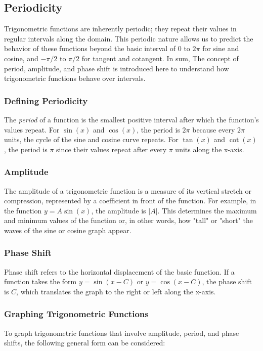 \documentclass[a4paper,12pt]{book}
\newcounter{example}
\begin{document}
\subsection{Periodicity}
\label{subsec:periodicity}

Trigonometric functions are inherently periodic; they repeat their values in regular intervals along the domain. This periodic nature allows us to predict the behavior of these functions beyond the basic interval of \(0\) to \(2\pi\) for sine and cosine, and \( -\pi/2 \) to \( \pi/2 \) for tangent and cotangent.
In sum, The concept of period, amplitude, and phase shift is introduced here to understand how trigonometric functions behave over intervals.

\subsubsection*{Defining Periodicity}
The \textit{period} of a function is the smallest positive interval after which the function's values repeat. For \( \sin(x) \) and \( \cos(x) \), the period is \(2\pi\) because every \(2\pi\) units, the cycle of the sine and cosine curve repeats. For \( \tan(x) \) and \( \cot(x) \), the period is \( \pi \) since their values repeat after every \( \pi \) units along the x-axis.

\subsubsection*{Amplitude}
The amplitude of a trigonometric function is a measure of its vertical stretch or compression, represented by a coefficient in front of the function. For example, in the function \( y = A\sin(x) \), the amplitude is \( |A| \). This determines the maximum and minimum values of the function or, in other words, how "tall" or "short" the waves of the sine or cosine graph appear.

\subsubsection*{Phase Shift}
Phase shift refers to the horizontal displacement of the basic function. If a function takes the form \( y = \sin(x - C) \) or \( y = \cos(x - C) \), the phase shift is \( C \), which translates the graph to the right or left along the x-axis.

\subsubsection*{Graphing Trigonometric Functions}
To graph trigonometric functions that involve amplitude, period, and phase shifts, the following general form can be considered:
\end{document}
